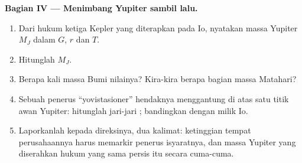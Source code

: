 \begin{problem}
\medskip
\noindent\textbf{Bagian IV --- Menimbang Yupiter sambil lalu.}
\begin{enumerate}[resume]
  \item Dari hukum ketiga Kepler yang diterapkan pada Io, nyatakan massa
        Yupiter $M_J$ dalam $G$, $r$ dan $T$.
  \item Hitunglah $M_J$.
  \item Berapa kali massa Bumi nilainya? Kira-kira berapa bagian massa
        Matahari?
  \item Sebuah penerus  ``yovistasioner'' hendaknya menggantung di
        atas satu titik awan Yupiter: hitunglah jari-jari ; bandingkan
        dengan milik Io.
  \item Laporkanlah kepada direksinya, dua kalimat: ketinggian tempat
        perusahaannya harus memarkir penerus isyaratnya, dan massa Yupiter
        yang diserahkan hukum yang sama persis itu secara cuma-cuma.
\end{enumerate}
\end{problem}
